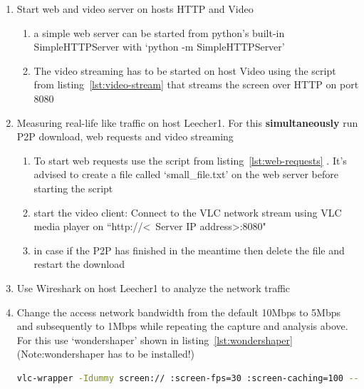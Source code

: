 \documentclass[a4paper]{article}
\begin{document}
\begin{enumerate}
\begin{enumerate}
          \end{enumerate}
    \item Start web and video server on hosts HTTP and Video
          \begin{enumerate}
              \item a simple web server can be started from python's built-in SimpleHTTPServer	with `python -m
                    SimpleHTTPServer'
              \item The video streaming has to be started on host Video using the script from
                    listing~\ref{lst:video-stream} that streams the screen over HTTP on port 8080
          \end{enumerate}
    \item Measuring real-life like traffic on host Leecher1. For this \textbf{simultaneously} run P2P download, web
          requests and video streaming
          \begin{enumerate}
              \item To start web requests use the script from listing~\ref{lst:web-requests} . It's advised to create
                    a file called `small\_file.txt' on the web server before starting the script
              \item start the video client: Connect to the VLC network stream using VLC media player on
                    ``http://\textless~Server IP address\textgreater:8080"
              \item in case if the P2P has finished in the meantime then delete the file and restart the download
          \end{enumerate}
    \item Use Wireshark on host Leecher1 to analyze the network traffic
    \item Change the access network bandwidth from the default 10Mbps to 5Mbps and subsequently to 1Mbps while
          repeating the capture and analysis above. For this use `wondershaper' shown in listing~\ref{lst:wondershaper}
          (Note:wondershaper has to be installed!)

          \begin{lstlisting}[language=bash,frame=single,breaklines,caption={VLC streaming server command},label=lst:video-stream]
vlc-wrapper -Idummy screen:// :screen-fps=30 :screen-caching=100 --sout '#transcode{vcodec=mp4v,vb=4096,acodec=mpga,ab=256,scale=1,width=1280,height=800}:http{port=8080,mux=ts}' 
\end{lstlisting}


\end{enumerate}
\end{document}
